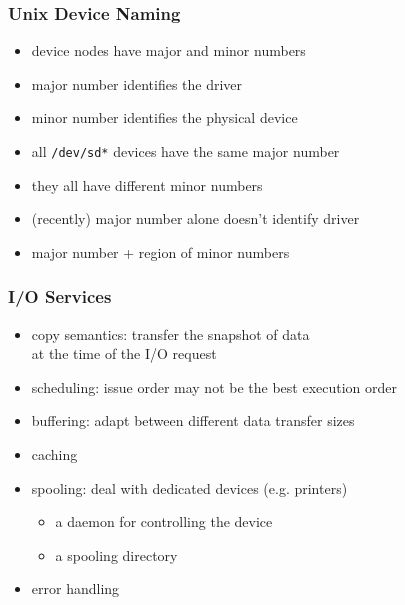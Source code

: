 \documentclass[dvipsnames]{beamer}
\begin{document}
\begin{frame}
  \frametitle{Unix Device Naming}

  \begin{itemize}
    \item device nodes have major and minor numbers
    \item major number identifies the driver
    \item minor number identifies the physical device

    \pause
    \medskip
    \item all \texttt{/dev/sd*} devices have the same major number
    \item they all have different minor numbers

    \pause
    \medskip
    \item (recently) major number alone doesn't identify driver
    \item major number + region of minor numbers
  \end{itemize}
\end{frame}

\begin{frame}
  \frametitle{I/O Services}

  \begin{itemize}
    \item copy semantics: transfer the snapshot of data\\
      at the time of the I/O request

    \pause
    \item scheduling: issue order may not be the best execution order

    \pause
    \item buffering: adapt between different data transfer sizes

    \pause
    \item caching

    \pause
    \item spooling: deal with dedicated devices (e.g. printers)
    \begin{itemize}
      \item a daemon for controlling the device
      \item a spooling directory
    \end{itemize}

    \pause
    \item error handling
  \end{itemize}
\end{frame}
\end{document}
